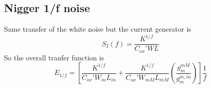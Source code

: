 \subsection{Nigger 1/f noise}
Same transfer of the white noise but the current generator is 
\begin{equation}
S_I(f)=\frac{K^{1/f}}{C_{ox}'WL}
\end{equation}
So the overall tranfer function is 
\begin{equation}
E_{1/f}=[\frac{K^{1/f}}{C_{ox}'W_{in}L_{in}}+\frac{K^{1/f}}{C_{ox}'W_{mM}L_{mM}}\left(\frac{g_{m}^{mM}}{g_{m}^{m,in}}\right)]\frac{1}{f}
\end{equation}


